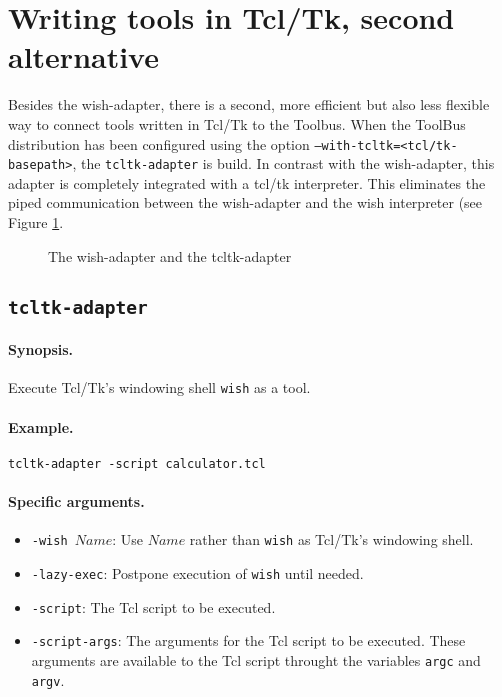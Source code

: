 
\section{\label{ToolsInTcl2}Writing tools in Tcl/Tk, second alternative}

Besides the wish-adapter, there is a second, more efficient but also
less flexible way to connect tools written in Tcl/Tk to the Toolbus.
When the ToolBus distribution has been configured using the option
{\tt --with-tcltk=<tcl/tk-basepath>}, the {\tt tcltk-adapter} is build.
In contrast with the wish-adapter, this adapter is completely integrated 
with a tcl/tk interpreter. This eliminates the piped communication between
the wish-adapter and the wish interpreter (see Figure \ref{tcltk-adapters}.

\begin{figure}[htb]
  \centerline{}
  \caption{\label{tcltk-adapters}The wish-adapter and the tcltk-adapter}
\end{figure}
 

\subsection{\label{tcltk-adapter}{\tt tcltk-adapter}}

\paragraph{Synopsis.} Execute Tcl/Tk's windowing shell {\tt wish} as a tool.

\paragraph{Example.} {\tt tcltk-adapter -script calculator.tcl}

\paragraph{Specific arguments.}
\begin{itemize}
\item {\tt -wish $Name$}: Use $Name$ rather than {\tt wish} as Tcl/Tk's windowing shell.
\item {\tt -lazy-exec}: Postpone execution of {\tt wish} until needed.
\item {\tt -script}: The Tcl script to be executed.
\item {\tt -script-args}: The arguments for the Tcl script to be executed.
      These arguments are available to the Tcl script throught the variables
      {\tt argc} and {\tt argv}.
\end{itemize}

